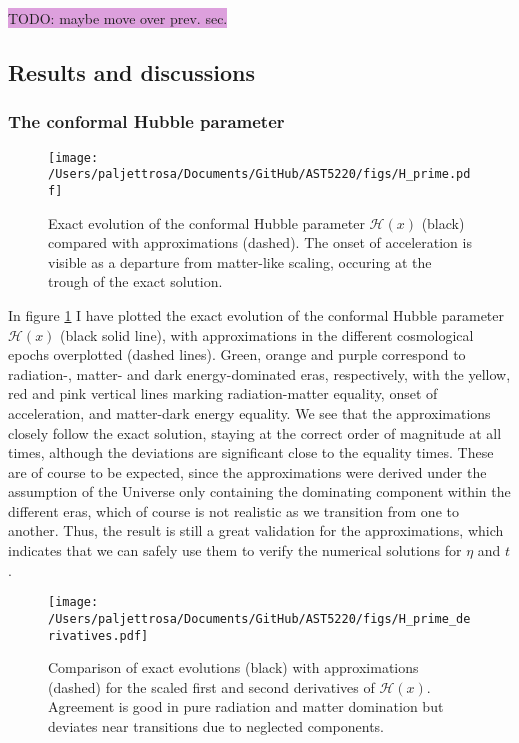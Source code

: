 \documentclass{aa}
\begin{document}
\colorbox{Plum}{TODO: maybe move over prev. sec.}


\subsection{Results and discussions}\label{subsec: I results}

\subsubsection{The conformal Hubble parameter}
\begin{figure}
  \centering
  \texttt{[image: /Users/paljettrosa/Documents/GitHub/AST5220/figs/H\_prime.pdf]}
  \caption{Exact evolution of the conformal Hubble parameter $\mathcal{H}(x)$ (black) compared with approximations (dashed). The onset of acceleration is visible as a departure from matter-like scaling, occuring at the trough of the exact solution.}\label{fig:H_prime}
\end{figure}


In figure \ref{fig:H_prime} I have plotted the exact evolution of the conformal Hubble parameter $\mathcal{H}(x)$ (black solid line), with approximations in the different cosmological epochs overplotted (dashed lines). Green, orange and purple correspond to radiation-, matter- and dark energy-dominated eras, respectively, with the yellow, red and pink vertical lines marking radiation-matter equality, onset of acceleration, and matter-dark energy equality. We see that the approximations closely follow the exact solution, staying at the correct order of magnitude at all times, although the deviations are significant close to the equality times. These are of course to be expected, since the approximations were derived under the assumption of the Universe only containing the dominating component within the different eras, which of course is not realistic as we transition from one to another. Thus, the result is still a great validation for the approximations, which indicates that we can safely use them to verify the numerical solutions for $\eta$ and $t$.

\begin{figure*}
    \centering
    \texttt{[image: /Users/paljettrosa/Documents/GitHub/AST5220/figs/H\_prime\_derivatives.pdf]}
    \caption{Comparison of exact evolutions (black) with approximations (dashed) for the scaled first and second derivatives of $\mathcal{H}(x)$. Agreement is good in pure radiation and matter domination but deviates near transitions due to neglected components.}\label{fig:H_prime derivatives}
\end{figure*}
\end{document}
